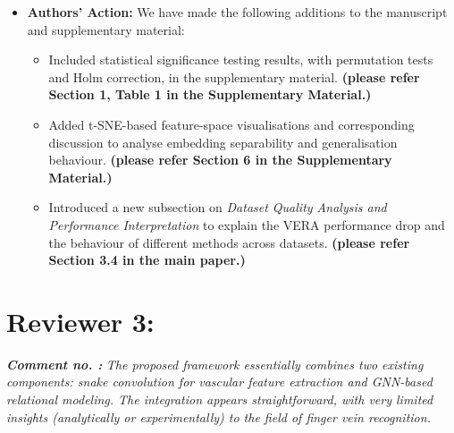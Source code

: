 \documentclass[11pt]{article}
\theoremstyle{remark}
\newcounter{mycounter} %
\newcommand\showReviewcounter{\stepcounter{mycounter}\themycounter}
\begin{document}
\begin{itemize}
	\item \textbf{Authors' Action:} 
	We have made the following additions to the manuscript and supplementary material:
	\begin{itemize}
	    \item Included statistical significance testing results, with permutation tests and Holm correction, in the supplementary material. \textbf{(please refer Section 1, Table 1 in the Supplementary Material.)}
	    \item Added t-SNE-based feature-space visualisations and corresponding discussion to analyse embedding separability and generalisation behaviour. \textbf{(please refer Section 6 in the Supplementary Material.)}
	    \item Introduced a new subsection on \textit{Dataset Quality Analysis and Performance Interpretation} to explain the VERA performance drop and the behaviour of different methods across datasets. \textbf{(please refer Section 3.4 in the main paper.)}
	\end{itemize}
\end{itemize}
\setcounter{mycounter}{0}
\color{blue} 
\section*{Reviewer  3:}

\color{blue}
\textbf{\textit{Comment no. \showReviewcounter:}} 
\textit{The proposed framework essentially combines two existing components: snake convolution for vascular feature extraction and GNN-based relational modeling. The integration appears straightforward, with very limited insights (analytically or experimentally) to the field of finger vein recognition.}
\color{black}
\end{document}
